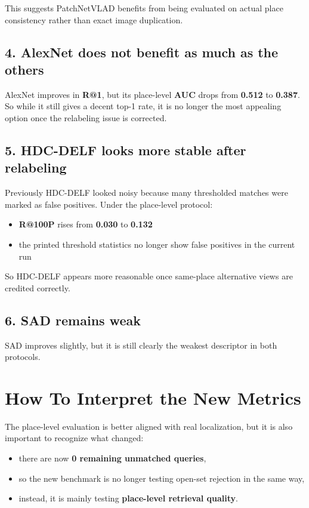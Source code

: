 \documentclass[11pt]{article}
\begin{document}
This suggests PatchNetVLAD benefits from being evaluated on actual place consistency rather than exact image duplication.

\subsection*{4. AlexNet does not benefit as much as the others}
AlexNet improves in \textbf{R@1}, but its place-level \textbf{AUC} drops from \textbf{0.512} to \textbf{0.387}. So while it still gives a decent top-1 rate, it is no longer the most appealing option once the relabeling issue is corrected.

\subsection*{5. HDC-DELF looks more stable after relabeling}
Previously HDC-DELF looked noisy because many thresholded matches were marked as false positives. Under the place-level protocol:
\begin{itemize}[leftmargin=*]
  \item \textbf{R@100P} rises from \textbf{0.030} to \textbf{0.132}
  \item the printed threshold statistics no longer show false positives in the current run
\end{itemize}

So HDC-DELF appears more reasonable once same-place alternative views are credited correctly.

\subsection*{6. SAD remains weak}
SAD improves slightly, but it is still clearly the weakest descriptor in both protocols.

\section{How To Interpret the New Metrics}
The place-level evaluation is better aligned with real localization, but it is also important to recognize what changed:
\begin{itemize}[leftmargin=*]
  \item there are now \textbf{0 remaining unmatched queries},
  \item so the new benchmark is no longer testing open-set rejection in the same way,
  \item instead, it is mainly testing \textbf{place-level retrieval quality}.
\end{itemize}
\end{document}
